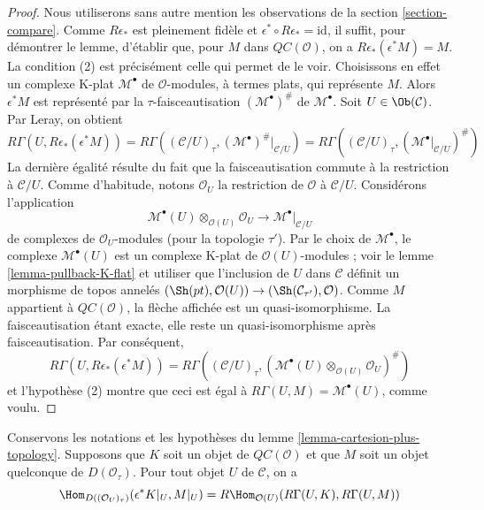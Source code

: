 \begin{proof}
Nous utiliserons sans autre mention les observations de la section
\ref{section-compare}. Comme $R\epsilon_*$ est pleinement fidèle et
$\epsilon^* \circ R\epsilon_* = \text{id}$, il suffit, pour démontrer le
lemme, d'établir que, pour $M$ dans $\mathit{QC}(\mathcal{O})$, on a
$R\epsilon_*(\epsilon^*M) = M$. La
condition (2) est précisément celle qui permet de le voir. Choisissons en
effet un complexe K-plat $\mathcal{M}^\bullet$ de $\mathcal{O}$-modules, à
termes plats, qui représente $M$. Alors $\epsilon^*M$ est représenté par la
$\tau$-faisceautisation $(\mathcal{M}^\bullet)^\#$ de
$\mathcal{M}^\bullet$. Soit $U \in \Ob(\mathcal{C})$. Par Leray, on obtient
$$
R\Gamma(U, R\epsilon_*(\epsilon^*M)) =
R\Gamma((\mathcal{C}/U)_\tau, (\mathcal{M}^\bullet)^\#|_{\mathcal{C}/U}) =
R\Gamma((\mathcal{C}/U)_\tau, (\mathcal{M}^\bullet|_{\mathcal{C}/U})^\#)
$$
La dernière égalité résulte du fait que la faisceautisation commute à la
restriction à $\mathcal{C}/U$. Comme d'habitude, notons $\mathcal{O}_U$ la
restriction de $\mathcal{O}$ à $\mathcal{C}/U$. Considérons l'application
$$
\mathcal{M}^\bullet(U) \otimes_{\mathcal{O}(U)} \mathcal{O}_U
\longrightarrow
\mathcal{M}^\bullet|_{\mathcal{C}/U}
$$
de complexes de $\mathcal{O}_U$-modules (pour la topologie $\tau'$). Par le
choix de $\mathcal{M}^\bullet$, le complexe $\mathcal{M}^\bullet(U)$ est un
complexe K-plat de $\mathcal{O}(U)$-modules ; voir le lemme
\ref{lemma-pullback-K-flat} et utiliser que l'inclusion de $U$ dans
$\mathcal{C}$ définit un morphisme de topos annelés
$(\Sh(pt), \mathcal{O}(U)) \to (\Sh(\mathcal{C}_{\tau'}), \mathcal{O})$.
Comme $M$ appartient à $\mathit{QC}(\mathcal{O})$, la flèche affichée est un
quasi-isomorphisme. La faisceautisation étant exacte, elle reste un
quasi-isomorphisme après faisceautisation. Par conséquent,
$$
R\Gamma(U, R\epsilon_*(\epsilon^*M)) =
R\Gamma((\mathcal{C}/U)_\tau,
(\mathcal{M}^\bullet(U) \otimes_{\mathcal{O}(U)} \mathcal{O}_U)^\#)
$$
et l'hypothèse (2) montre que ceci est égal à
$R\Gamma(U, M) = \mathcal{M}^\bullet(U)$, comme voulu.
\end{proof}

\begin{lemma}
\label{lemma-QC-hom-out-of-plus-topology}
Conservons les notations et les hypothèses du lemme
\ref{lemma-cartesion-plus-topology}. Supposons que $K$ soit un objet de
$\mathit{QC}(\mathcal{O})$ et que $M$ soit un objet quelconque de
$D(\mathcal{O}_\tau)$. Pour tout objet $U$ de $\mathcal{C}$, on a
$$
\Hom_{D((\mathcal{O}_U)_\tau)}(\epsilon^*K|_U, M|_U) =
R\Hom_{\mathcal{O}(U)}(R\Gamma(U, K), R\Gamma(U, M))
$$
\end{lemma}


